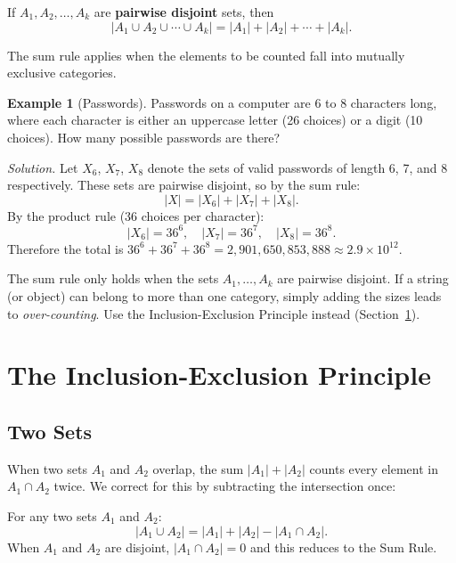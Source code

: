 \documentclass[11pt, a4paper, notitlepage]{report}
\theoremstyle{definition}
\newtheorem{example}[theorem]{Example}
\theoremstyle{remark}
\begin{document}
\begin{keyresult}[title={Key Result: Sum Rule}]
If $A_1, A_2, \ldots, A_k$ are \textbf{pairwise disjoint} sets, then
\[
  |A_1 \cup A_2 \cup \cdots \cup A_k| = |A_1| + |A_2| + \cdots + |A_k|.
\]
\end{keyresult}

The sum rule applies when the elements to be counted fall into mutually exclusive categories.

\begin{example}[Passwords]
Passwords on a computer are 6 to 8 characters long, where each character is either an
uppercase letter (26 choices) or a digit (10 choices). How many possible passwords are there?

\textit{Solution.} Let $X_6$, $X_7$, $X_8$ denote the sets of valid passwords of length 6,
7, and 8 respectively. These sets are pairwise disjoint, so by the sum rule:
\[
  |X| = |X_6| + |X_7| + |X_8|.
\]
By the product rule (36 choices per character):
\[
  |X_6| = 36^6, \quad |X_7| = 36^7, \quad |X_8| = 36^8.
\]
Therefore the total is $36^6 + 36^7 + 36^8 = 2{,}901{,}650{,}853{,}888 \approx 2.9 \times 10^{12}$.
\end{example}

\begin{warning}[title={Warning: The Sum Rule Requires Disjoint Sets}]
The sum rule only holds when the sets $A_1, \ldots, A_k$ are pairwise disjoint. If a string (or
object) can belong to more than one category, simply adding the sizes leads to
\emph{over-counting}. Use the Inclusion-Exclusion Principle instead (Section~\ref{sec:ie}).
\end{warning}

\section{The Inclusion-Exclusion Principle}
\label{sec:ie}

\subsection{Two Sets}

When two sets $A_1$ and $A_2$ overlap, the sum $|A_1| + |A_2|$ counts every element in
$A_1 \cap A_2$ twice. We correct for this by subtracting the intersection once:

\begin{keyresult}[title={Key Result: Inclusion-Exclusion (Two Sets)}]
For any two sets $A_1$ and $A_2$:
\[
  |A_1 \cup A_2| = |A_1| + |A_2| - |A_1 \cap A_2|.
\]
When $A_1$ and $A_2$ are disjoint, $|A_1 \cap A_2| = 0$ and this reduces to the Sum Rule.
\end{keyresult}
\end{document}
